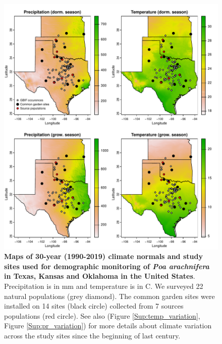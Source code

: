 \documentclass[12pt]{article}\usepackage[]{graphicx}\usepackage[dvipsnames]{xcolor}
\begin{document}
\begin{figure}[H]
  \begin{center}
    \includegraphics[width=0.90\linewidth]{Figures/POAR_survey_garden_map.pdf}
  \caption{\textbf{Maps of 30-year (1990-2019) climate normals and study sites used for demographic monitoring of \emph{Poa arachnifera} in Texas, Kansas and Oklahoma in the United States}.
  Precipitation is in mm and temperature is in \degree C.
  We surveyed 22 natural populations (grey diamond).
  The common garden sites were installed on 14 sites (black circle) collected from 7 sources populations (red circle).
  See also (Figure \ref{Sup:temp_variation}, Figure \ref{Sup:pr_variation}) for more details about climate variation across the study sites since the beginning of last century.}
  \label{fig:study_design}
  \end{center}
\end{figure}
\end{document}
